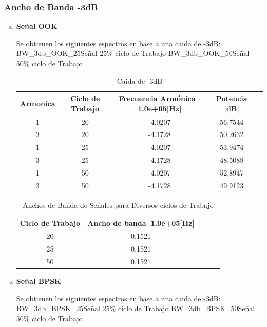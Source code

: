 \documentclass[letterpaper, titlepage]{article}
\begin{document}
		\subsubsection{Ancho de Banda -3dB}
			\begin{enumerate}[a)]
				\item \textbf{Señal OOK}
				
					Se obtienen los siguientes espectros en base a una caida de -3dB:\\
							 {BW_3db_OOK_25}{\label{fig:sim}}{Señal 25\% ciclo de Trabajo}
							 {BW_3db_OOK_50}{\label{fig:sim}}{Señal 50\% ciclo de Trabajo}\\
					\begin{table}[ht]
						\centering
						\begin{tabular}{c c c c c}
							Armonica & Ciclo de Trabajo & Frecuencia Armónica $\cdot$ 1.0e+05[Hz] & Potencia [dB]\\
							\hline
							1 & 20 & -4.0207 & 56.7544  \\
							3 & 20 & -4.1728 & 50.2632	\\
							1 & 25 & -4.0207 & 53.9474   \\
							3 & 25 & -4.1728 & 48.5088   \\
							1 & 50 & -4.0207 & 52.8947  \\
							3 & 50 & -4.1728 & 49.9123   \\
						\end{tabular}
						\caption{Caida de -3dB}
						\label{tab:tabla1}
					\end{table}	

					\begin{table}[ht]
						\centering
						\begin{tabular}{c c c c c}
							Ciclo de Trabajo & Ancho de banda$\cdot$ 1.0e+05[Hz] \\
							\hline
							20 & 0.1521   \\
							25 & 0.1521  \\
							50 & 0.1521   \\
						\end{tabular}
						\caption{Anchos de Banda de Señales para Diversos ciclos de Trabajo}
						\label{tab:tabla1}
					\end{table}
					\newpage
				\item \textbf{Señal BPSK}
				
					Se obtienen los siguientes espectros en base a una caida de -3dB:\\
							 {BW_3db_BPSK_25}{\label{fig:sim}}{Señal 25\% ciclo de Trabajo}
							 {BW_3db_BPSK_50}{\label{fig:sim}}{Señal 50\% ciclo de Trabajo}\\	
			

\end{enumerate}
\end{document}

